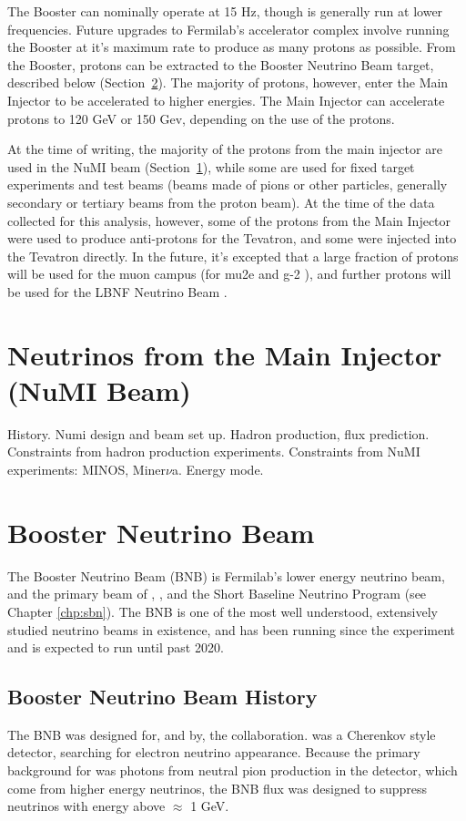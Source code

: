 The Booster can nominally operate at 15 Hz, though is generally run at lower frequencies.  Future upgrades to Fermilab's accelerator complex involve running the Booster at it's maximum rate to produce as many protons as possible.  From the Booster, protons can be extracted to the Booster Neutrino Beam target, described below (Section~\ref{sec:bnb}).  The majority of protons, however, enter the Main Injector to be accelerated to higher energies.  The Main Injector can accelerate protons to 120 GeV or 150 Gev, depending on the use of the protons.

At the time of writing, the majority of the protons from the main injector are used in the NuMI beam (Section~\ref{sec:numi_beam}), while some are used for fixed target experiments and test beams (beams made of pions or other particles, generally secondary or tertiary beams from the proton beam).  At the time of the data collected for this analysis, however, some of the protons from the Main Injector were used to produce anti-protons for the Tevatron, and some were injected into the Tevatron directly.  In the future, it's excepted that a large fraction of protons will be used for the muon campus (for mu2e and g-2 \cite{Bartoszek:2014mya} \cite{Grange:2015fou}), and further protons will be used for the LBNF Neutrino Beam \cite{DUNE}.

\section{Neutrinos from the Main Injector (NuMI Beam)}
\label{sec:numi_beam}

History. Numi design and beam set up.  Hadron production, flux prediction.  Constraints from hadron production experiments.  Constraints from NuMI experiments: MINOS, Miner$\nu$a.  Energy mode.

\section{Booster Neutrino Beam}
\label{sec:bnb}

The Booster Neutrino Beam (BNB) is Fermilab's lower energy neutrino beam, and the primary beam of \MB, \uboone, and the Short Baseline Neutrino Program (see Chapter \ref{chp:sbn}).  The BNB is one of the most well understood, extensively studied neutrino beams in existence, and has been running since the \MB experiment and is expected to run until past 2020.

\subsection{Booster Neutrino Beam History}
The BNB was designed for, and by, the \MB collaboration.  \MB was a Cherenkov style detector, searching for electron neutrino appearance.  Because the primary background for \MB was photons from neutral pion production in the detector, which come from higher energy neutrinos, the BNB flux was designed to suppress neutrinos with energy above $\approx$ 1 GeV.

